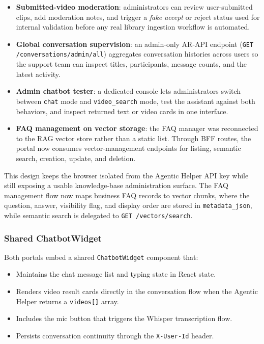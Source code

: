 \begin{itemize}
  \item \textbf{Submitted-video moderation}: administrators can review user-submitted clips,
    add moderation notes, and trigger a \emph{fake accept} or reject status used for internal
    validation before any real library ingestion workflow is automated.
  \item \textbf{Global conversation supervision}: an admin-only AR-API endpoint
    (\texttt{GET /conversations/admin/all}) aggregates conversation histories across users so the
    support team can inspect titles, participants, message counts, and the latest activity.
  \item \textbf{Admin chatbot tester}: a dedicated console lets administrators switch between
    \texttt{chat} mode and \texttt{video\_search} mode, test the assistant against both
    behaviors, and inspect returned text or video cards in one interface.
  \item \textbf{FAQ management on vector storage}: the FAQ manager was reconnected to the RAG
    vector store rather than a static list. Through BFF routes, the portal now consumes
    vector-management endpoints for listing, semantic search, creation, update, and deletion.
\end{itemize}

This design keeps the browser isolated from the Agentic Helper API key while still exposing a
usable knowledge-base administration surface. The FAQ management flow now maps business FAQ
records to vector chunks, where the question, answer, visibility flag, and display order are
stored in \texttt{metadata\_json}, while semantic search is delegated to
\texttt{GET /vectors/search}.

\subsubsection{Shared ChatbotWidget}

Both portals embed a shared \texttt{ChatbotWidget} component that:
\begin{itemize}
  \item Maintains the chat message list and typing state in React state.
  \item Renders video result cards directly in the conversation flow when the Agentic Helper
    returns a \texttt{videos[]} array.
  \item Includes the mic button that triggers the Whisper transcription flow.
  \item Persists conversation continuity through the \texttt{X-User-Id} header.
\end{itemize}

